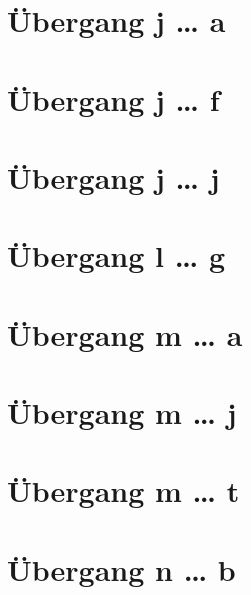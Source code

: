 \documentclass[a4paper,landscape]{article}
\begin{document}
\hspace*{-1ex}
\newpage

\section{Übergang j … a }

\hspace*{-1ex}
\newpage

\section{Übergang j … f }

\hspace*{-1ex}
\newpage

\section{Übergang j … j }

\hspace*{-1ex}
\newpage

\section{Übergang l … g }

\hspace*{-1ex}
\newpage

\section{Übergang m … a }

\hspace*{-1ex}
\newpage

\section{Übergang m … j }

\hspace*{-1ex}
\newpage

\section{Übergang m … t }

\hspace*{-1ex}
\newpage

\section{Übergang n … b }
\end{document}
